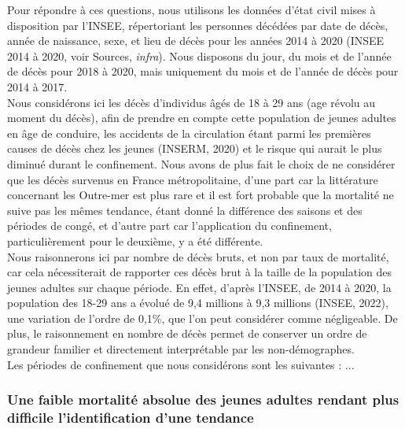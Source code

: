 \documentclass[titlepage]{article}
\begin{document}
Pour répondre à ces questions, nous utilisons les données d'état civil mises à disposition par l'INSEE, répertoriant les personnes décédées par date de décès, année de naissance, sexe, et lieu de décès pour les années 2014 à 2020 (INSEE 2014 à 2020, voir Sources, \textit{infra}). Nous disposons du jour, du mois et de l'année de décès pour 2018 à 2020, mais uniquement du mois et de l'année de décès pour 2014 à 2017. \\

Nous considérons ici les décès d'individus âgés de 18 à 29 ans (age révolu au moment du décès), afin de prendre en compte cette population de jeunes adultes en âge de conduire, les accidents de la circulation étant parmi les premières causes de décès chez les jeunes (INSERM, 2020) et le risque qui aurait le plus diminué durant le confinement. Nous avons de plus fait le choix de ne considérer que les décès survenus en France métropolitaine, d'une part car la littérature concernant les Outre-mer est plus rare et il est fort probable que la mortalité ne suive pas les mêmes tendance, étant donné la différence des saisons et des périodes de congé, et d'autre part car l'application du confinement, particulièrement pour le deuxième, y a été différente. \\


Nous raisonnerons ici par nombre de décès bruts, et non par taux de mortalité, car cela nécessiterait de rapporter ces décès brut à la taille de la population des jeunes adultes sur chaque période. En effet, d’après l’INSEE, de 2014 à 2020, la population des 18-29 ans a évolué de 9,4 millions à 9,3 millions (INSEE, 2022), une variation de l’ordre de 0,1\%, que l'on peut considérer comme négligeable. De plus, le raisonnement en nombre de décès permet de conserver un ordre de grandeur familier et directement interprétable par les non-démographes. \\ %

Les périodes de confinement que nous considérons sont les suivantes : ...

\subsubsection*{Une faible mortalité absolue des jeunes adultes rendant plus difficile l'identification d'une tendance}
\end{document}
